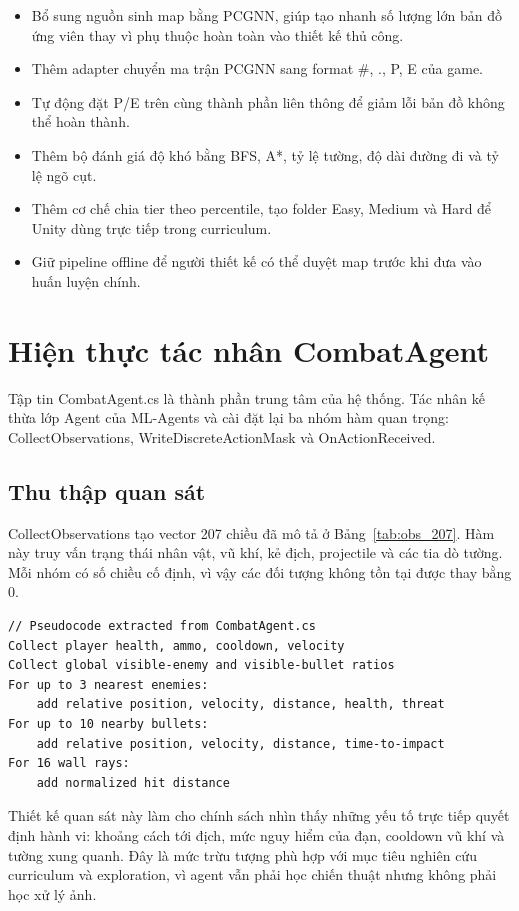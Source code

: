 \begin{itemize}
    \item Bổ sung nguồn sinh map bằng PCGNN, giúp tạo nhanh số lượng lớn bản đồ ứng viên thay vì phụ thuộc hoàn toàn vào thiết kế thủ công.
    \item Thêm adapter chuyển ma trận PCGNN sang format \#, ., P, E của game.
    \item Tự động đặt P/E trên cùng thành phần liên thông để giảm lỗi bản đồ không thể hoàn thành.
    \item Thêm bộ đánh giá độ khó bằng BFS, A*, tỷ lệ tường, độ dài đường đi và tỷ lệ ngõ cụt.
    \item Thêm cơ chế chia tier theo percentile, tạo folder Easy, Medium và Hard để Unity dùng trực tiếp trong curriculum.
    \item Giữ pipeline offline để người thiết kế có thể duyệt map trước khi đưa vào huấn luyện chính.
\end{itemize}

\section{Hiện thực tác nhân CombatAgent}

Tập tin CombatAgent.cs là thành phần trung tâm của hệ thống. Tác nhân kế thừa lớp Agent của ML-Agents và cài đặt lại ba nhóm hàm quan trọng: CollectObservations, WriteDiscreteActionMask và OnActionReceived.

\subsection{Thu thập quan sát}

CollectObservations tạo vector 207 chiều đã mô tả ở Bảng~\ref{tab:obs_207}. Hàm này truy vấn trạng thái nhân vật, vũ khí, kẻ địch, projectile và các tia dò tường. Mỗi nhóm có số chiều cố định, vì vậy các đối tượng không tồn tại được thay bằng 0.

\begin{lstlisting}
// Pseudocode extracted from CombatAgent.cs
Collect player health, ammo, cooldown, velocity
Collect global visible-enemy and visible-bullet ratios
For up to 3 nearest enemies:
    add relative position, velocity, distance, health, threat
For up to 10 nearby bullets:
    add relative position, velocity, distance, time-to-impact
For 16 wall rays:
    add normalized hit distance
\end{lstlisting}

Thiết kế quan sát này làm cho chính sách nhìn thấy những yếu tố trực tiếp quyết định hành vi: khoảng cách tới địch, mức nguy hiểm của đạn, cooldown vũ khí và tường xung quanh. Đây là mức trừu tượng phù hợp với mục tiêu nghiên cứu curriculum và exploration, vì agent vẫn phải học chiến thuật nhưng không phải học xử lý ảnh.


